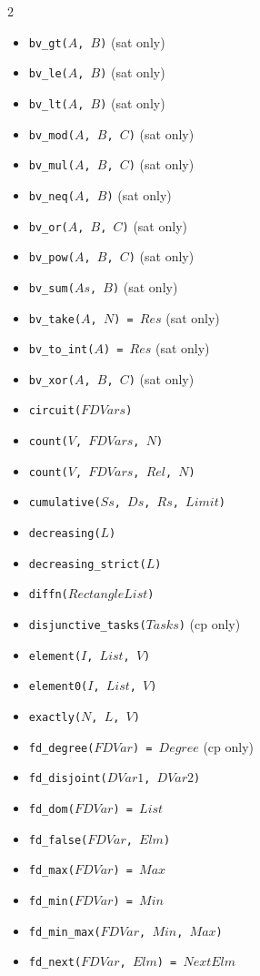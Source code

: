 \documentclass[10pt]{article}
\begin{document}
\begin{multicols}{2}
\begin{scriptsize}
\begin{itemize}
\item \texttt{bv\_gt($A$, $B$)} (sat only)
\item \texttt{bv\_le($A$, $B$)} (sat only)
\item \texttt{bv\_lt($A$, $B$)} (sat only)
\item \texttt{bv\_mod($A$, $B$, $C$)} (sat only)
\item \texttt{bv\_mul($A$, $B$, $C$)} (sat only)
\item \texttt{bv\_neq($A$, $B$)} (sat only)
\item \texttt{bv\_or($A$, $B$, $C$)} (sat only)
\item \texttt{bv\_pow($A$, $B$, $C$)} (sat only)
\item \texttt{bv\_sum($As$, $B$)} (sat only)
\item \texttt{bv\_take($A$, $N$) = $Res$} (sat only)
\item \texttt{bv\_to\_int($A$) = $Res$} (sat only)
\item \texttt{bv\_xor($A$, $B$, $C$)} (sat only)
\item \texttt{circuit($FDVars$)}
\item \texttt{count($V$, $FDVars$, $N$)}
\item \texttt{count($V$, $FDVars$, $Rel$, $N$)}
\item \texttt{cumulative($Ss$, $Ds$, $Rs$, $Limit$)}
\item \texttt{decreasing($L$)}
\item \texttt{decreasing\_strict($L$)}
\item \texttt{diffn($RectangleList$)}
\item \texttt{disjunctive\_tasks($Tasks$)} (cp only)
\item \texttt{element($I$, $List$, $V$)}
\item \texttt{element0($I$, $List$, $V$)}
\item \texttt{exactly($N$, $L$, $V$)}
\item \texttt{fd\_degree($FDVar$) = $Degree$} (cp only)
\item \texttt{fd\_disjoint($DVar1$, $DVar2$)} 
\item \texttt{fd\_dom($FDVar$) = $List$}
\item \texttt{fd\_false($FDVar$, $Elm$)}
\item \texttt{fd\_max($FDVar$) = $Max$}
\item \texttt{fd\_min($FDVar$) = $Min$}
\item \texttt{fd\_min\_max($FDVar$, $Min$, $Max$)}
\item \texttt{fd\_next($FDVar$, $Elm$) = $NextElm$}

\end{itemize}
\end{scriptsize}
\end{multicols}
\end{document}
